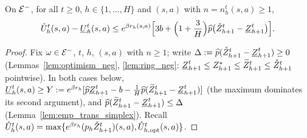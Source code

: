 \begin{lemma}\label{lem:certificate_neg}
\leanok
{}
On $\mathcal{E}^-$, for all $t \ge 0$, $h \in \{1, \dots, H\}$ and $(s,a)$ with $n = n_h^t(s,a) \ge 1$,
\[
  \mathring{U}_h^t(s,a) - \underline{U}_h^t(s,a)
  \le e^{\beta r_h(s,a)}\Big[3 b + \Big(1 + \frac3H\Big)\widehat{p}\big(\mathring{Z}^t_{h+1} - \underline{Z}^t_{h+1}\big)\Big] .
\]
\end{lemma}

\begin{proof}
\leanok
Fix $\omega \in \mathcal{E}^-$, $t$, $h$, $(s,a)$ with $n \ge 1$; write $\Delta := \widehat{p}(\mathring{Z}^t_{h+1} - \underline{Z}^t_{h+1}) \ge 0$
(Lemmas~\ref{lem:optimism_neg}, \ref{lem:ring_neg}: $\underline{Z}^t_{h+1} \le Z^*_{h+1} \le \widetilde{Z}^t_{h+1} \le \mathring{Z}^t_{h+1}$
pointwise). In both cases below, $\underline{U}_h^t(s,a) \ge Y := e^{\beta r_h}[\widehat{p}\underline{Z}^t_{h+1} - b - \frac1H\widehat{p}(\widetilde{Z}^t_{h+1} - \underline{Z}^t_{h+1})]$
(the maximum dominates its second argument), and $\widehat{p}(\widetilde{Z}^t_{h+1} - \underline{Z}^t_{h+1}) \le \Delta$
(Lemma~\ref{lem:emp_trans_simplex}). Recall $\mathring{U}_h^t(s,a) = \max\{e^{\beta r_h}(p_h\mathring{Z}^t_{h+1})(s,a), \mathring{U}^t_{h,\mathrm{opt}}(s,a)\}$.


\end{proof}
